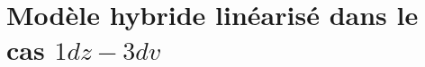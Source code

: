 \renewcommand{\localPath}{chap3}

\chapter{Modèle hybride linéarisé dans le cas $1dz-3dv$}










